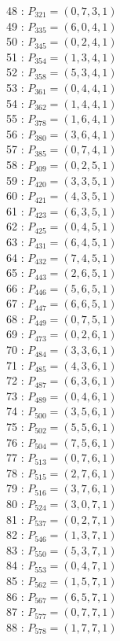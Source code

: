 \documentclass{article}
\begin{document}
{\begin{multicols}{3}
48 : $P_{321}=( 0, 7, 3, 1 )$\\
49 : $P_{335}=( 6, 0, 4, 1 )$\\
50 : $P_{345}=( 0, 2, 4, 1 )$\\
51 : $P_{354}=( 1, 3, 4, 1 )$\\
52 : $P_{358}=( 5, 3, 4, 1 )$\\
53 : $P_{361}=( 0, 4, 4, 1 )$\\
54 : $P_{362}=( 1, 4, 4, 1 )$\\
55 : $P_{378}=( 1, 6, 4, 1 )$\\
56 : $P_{380}=( 3, 6, 4, 1 )$\\
57 : $P_{385}=( 0, 7, 4, 1 )$\\
58 : $P_{409}=( 0, 2, 5, 1 )$\\
59 : $P_{420}=( 3, 3, 5, 1 )$\\
60 : $P_{421}=( 4, 3, 5, 1 )$\\
61 : $P_{423}=( 6, 3, 5, 1 )$\\
62 : $P_{425}=( 0, 4, 5, 1 )$\\
63 : $P_{431}=( 6, 4, 5, 1 )$\\
64 : $P_{432}=( 7, 4, 5, 1 )$\\
65 : $P_{443}=( 2, 6, 5, 1 )$\\
66 : $P_{446}=( 5, 6, 5, 1 )$\\
67 : $P_{447}=( 6, 6, 5, 1 )$\\
68 : $P_{449}=( 0, 7, 5, 1 )$\\
69 : $P_{473}=( 0, 2, 6, 1 )$\\
70 : $P_{484}=( 3, 3, 6, 1 )$\\
71 : $P_{485}=( 4, 3, 6, 1 )$\\
72 : $P_{487}=( 6, 3, 6, 1 )$\\
73 : $P_{489}=( 0, 4, 6, 1 )$\\
74 : $P_{500}=( 3, 5, 6, 1 )$\\
75 : $P_{502}=( 5, 5, 6, 1 )$\\
76 : $P_{504}=( 7, 5, 6, 1 )$\\
77 : $P_{513}=( 0, 7, 6, 1 )$\\
78 : $P_{515}=( 2, 7, 6, 1 )$\\
79 : $P_{516}=( 3, 7, 6, 1 )$\\
80 : $P_{524}=( 3, 0, 7, 1 )$\\
81 : $P_{537}=( 0, 2, 7, 1 )$\\
82 : $P_{546}=( 1, 3, 7, 1 )$\\
83 : $P_{550}=( 5, 3, 7, 1 )$\\
84 : $P_{553}=( 0, 4, 7, 1 )$\\
85 : $P_{562}=( 1, 5, 7, 1 )$\\
86 : $P_{567}=( 6, 5, 7, 1 )$\\
87 : $P_{577}=( 0, 7, 7, 1 )$\\
88 : $P_{578}=( 1, 7, 7, 1 )$\\
\end{multicols}


}
\end{document}
